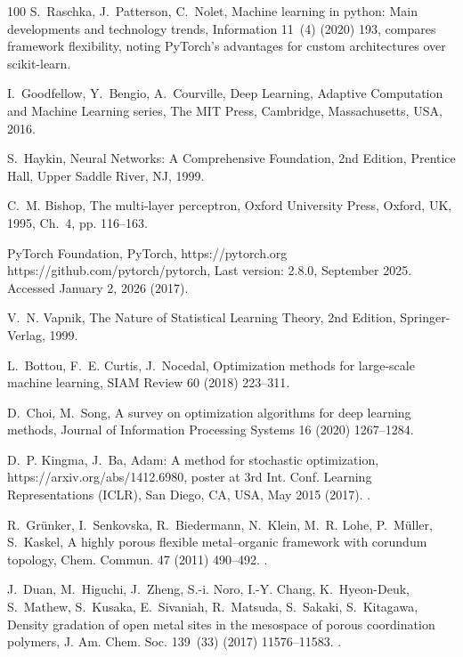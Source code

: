 \documentclass[review]{elsarticle}
\begin{document}
\begin{thebibliography}{100}
S.~Raschka, J.~Patterson, C.~Nolet, Machine learning in python: Main
  developments and technology trends, Information 11~(4) (2020) 193, compares
  framework flexibility, noting PyTorch's advantages for custom architectures
  over scikit-learn.

I.~Goodfellow, Y.~Bengio, A.~Courville, {Deep Learning}, Adaptive Computation
  and Machine Learning series, {The MIT Press}, Cambridge, Massachusetts, USA,
  2016.

S.~Haykin, Neural Networks: A Comprehensive Foundation, 2nd Edition, Prentice
  Hall, Upper Saddle River, NJ, 1999.

C.~M. Bishop, The multi-layer perceptron, Oxford University Press, Oxford, UK,
  1995, Ch.~4, pp. 116--163.

{PyTorch Foundation}, {PyTorch}, https://pytorch.org
  https://github.com/pytorch/pytorch, {Last version: 2.8.0, September 2025.
  Accessed January 2, 2026} (2017).

V.~N. Vapnik, The Nature of Statistical Learning Theory, 2nd Edition,
  Springer-Verlag, 1999.

L.~Bottou, F.~E. Curtis, J.~Nocedal, Optimization methods for large-scale
  machine learning, SIAM Review 60 (2018) 223--311.

D.~Choi, M.~Song, A survey on optimization algorithms for deep learning
  methods, Journal of Information Processing Systems 16 (2020) 1267--1284.

D.~P. Kingma, J.~Ba, Adam: A method for stochastic optimization,
  https://arxiv.org/abs/1412.6980, poster at 3rd Int. Conf. Learning
  Representations (ICLR), San Diego, CA, USA, May 2015 (2017).
\newblock \href {http://arxiv.org/abs/1412.6980} {}.

R.~Grünker, I.~Senkovska, R.~Biedermann, N.~Klein, M.~R. Lohe, P.~Müller,
  S.~Kaskel, A highly porous flexible metal–organic framework with corundum
  topology, Chem. Commun. 47 (2011) 490--492.
\newblock \href {https://doi.org/10.1039/C0CC02273J}
  {}.

J.~Duan, M.~Higuchi, J.~Zheng, S.-i. Noro, I.-Y. Chang, K.~Hyeon-Deuk,
  S.~Mathew, S.~Kusaka, E.~Sivaniah, R.~Matsuda, S.~Sakaki, S.~Kitagawa,
  Density gradation of open metal sites in the mesospace of porous coordination
  polymers, J. Am. Chem. Soc. 139~(33) (2017) 11576--11583.
\newblock \href {https://doi.org/10.1021/jacs.7b05702}
  {}.


\end{thebibliography}
\end{document}
